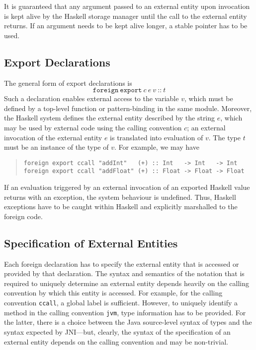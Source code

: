 \documentclass[a4paper,twosides]{article}
\newcommand{\code}[1]{\texttt{#1}}
\begin{document}
It is guaranteed that any argument passed to an external entity upon
invocation is kept alive by the Haskell storage manager until the call to the
external entity returns.  If an argument needs to be kept alive longer, a
stable pointer has to be used.

\subsection{Export Declarations}

The general form of export declarations is
%
\[
\code{foreign}~\code{export}~c~e~v~\code{{::}}~t
\]
%
Such a declaration enables external access to the variable $v$, which must be
defined by a top-level function or pattern-binding in the same module.
Moreover, the Haskell system defines the external entity described by the
string $e$, which may be used by external code using the calling convention
$c$; an external invocation of the external entity $e$ is translated into
evaluation of $v$.  The type $t$ must be an instance of the type of $v$.  For
example, we may have
%
\begin{quote}
\begin{verbatim}
foreign export ccall "addInt"   (+) :: Int   -> Int   -> Int
foreign export ccall "addFloat" (+) :: Float -> Float -> Float
\end{verbatim}
\end{quote}

If an evaluation triggered by an external invocation of an exported Haskell
value returns with an exception, the system behaviour is undefined.  Thus,
Haskell exceptions have to be caught within Haskell and explicitly marshalled
to the foreign code.

\subsection{Specification of External Entities}
\label{sec:extent}

Each foreign declaration has to specify the external entity that is accessed
or provided by that declaration.  The syntax and semantics of the notation
that is required to uniquely determine an external entity depends heavily on
the calling convention by which this entity is accessed.  For example, for the
calling convention \code{ccall}, a global label is sufficient.  However, to
uniquely identify a method in the calling convention \code{jvm}, type
information has to be provided.  For the latter, there is a choice between the
Java source-level syntax of types and the syntax expected by JNI---but,
clearly, the syntax of the specification of an external entity depends on the
calling convention and may be non-trivial.
\end{document}
